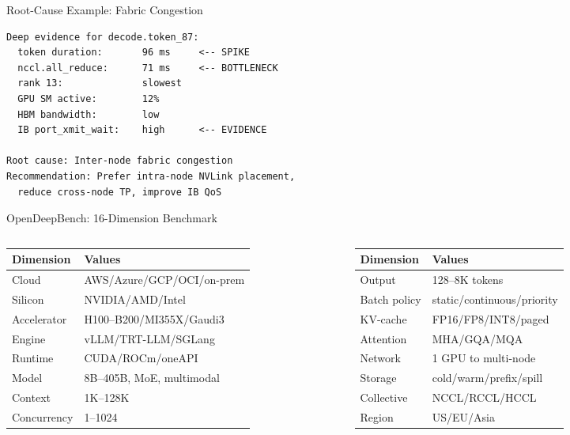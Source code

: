 \documentclass[aspectratio=169,10pt]{beamer}
\begin{document}
\begin{frame}[fragile]{Root-Cause Example: Fabric Congestion}
\begin{lstlisting}
Deep evidence for decode.token_87:
  token duration:       96 ms     <-- SPIKE
  nccl.all_reduce:      71 ms     <-- BOTTLENECK
  rank 13:              slowest
  GPU SM active:        12%
  HBM bandwidth:        low
  IB port_xmit_wait:    high      <-- EVIDENCE

Root cause: Inter-node fabric congestion
Recommendation: Prefer intra-node NVLink placement,
  reduce cross-node TP, improve IB QoS
\end{lstlisting}
\end{frame}

\begin{frame}{OpenDeepBench: 16-Dimension Benchmark}
\small
\begin{columns}[T]
\begin{tabular}{@{}ll@{}}
\toprule
\textbf{Dimension} & \textbf{Values} \\
\midrule
Cloud & AWS/Azure/GCP/OCI/on-prem \\
Silicon & NVIDIA/AMD/Intel \\
Accelerator & H100--B200/MI355X/Gaudi3 \\
Engine & vLLM/TRT-LLM/SGLang \\
Runtime & CUDA/ROCm/oneAPI \\
Model & 8B--405B, MoE, multimodal \\
Context & 1K--128K \\
Concurrency & 1--1024 \\
\bottomrule
\end{tabular}

\begin{tabular}{@{}ll@{}}
\toprule
\textbf{Dimension} & \textbf{Values} \\
\midrule
Output & 128--8K tokens \\
Batch policy & static/continuous/priority \\
KV-cache & FP16/FP8/INT8/paged \\
Attention & MHA/GQA/MQA \\
Network & 1 GPU to multi-node \\
Storage & cold/warm/prefix/spill \\
Collective & NCCL/RCCL/HCCL \\
Region & US/EU/Asia \\
\bottomrule
\end{tabular}
\end{columns}
\end{frame}
\end{document}
